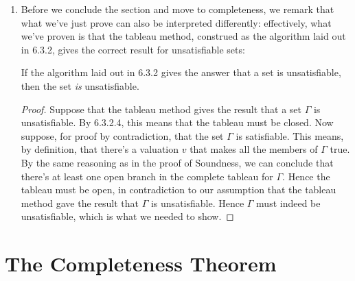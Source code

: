 \begin{enumerate}[\thesection.1]
\begin{proof}
	But if $B$ cannot be closed, then $B$ must be open. Since a tableau is open iff at least one branch in the tableau is open (6.3.2.4), we conclude that our complete tableau must be open. Hence $\Gamma\nvdash\phi$, by definition, which is what we needed to show.
	
	\end{proof}
	
	\item Before we conclude the section and move to completeness, we remark that what we've just prove can also be interpreted differently: effectively, what we've proven is that the tableau method, construed as the algorithm laid out in 6.3.2, gives the correct result for unsatisfiable sets:
	\begin{theorem}
	If the algorithm laid out in 6.3.2 gives the answer that a set is unsatisfiable, then the set \emph{is} unsatisfiable. 
	\end{theorem}
	\begin{proof}
	Suppose that the tableau method gives the result that a set $\Gamma$ is unsatisfiable. By 6.3.2.4, this means that the tableau must be closed. Now suppose, for proof by contradiction, that the set $\Gamma$ is satisfiable. This means, by definition, that there's a valuation $v$ that makes all the members of $\Gamma$ true. By the same reasoning as in the proof of Soundness, we can conclude that there's at least one open branch in the complete tableau for $\Gamma$. Hence the tableau must be open, in contradiction to our assumption that the tableau method gave the result that $\Gamma$ is unsatisfiable. Hence $\Gamma$ must indeed be unsatisfiable, which is what we needed to show. 
	\end{proof}

\end{enumerate}

\section{The Completeness Theorem}

